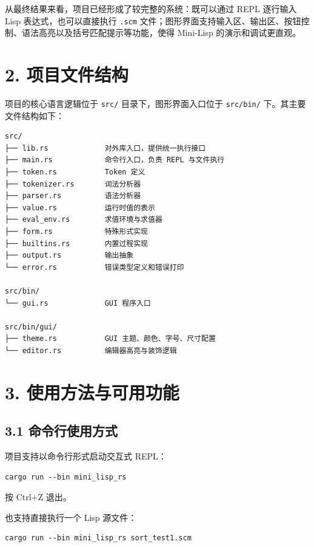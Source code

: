 \documentclass[12pt, a4paper]{ctexart}
\begin{document}
从最终结果来看，项目已经形成了较完整的系统：既可以通过 REPL 逐行输入 Lisp 表达式，也可以直接执行 \verb|.scm| 文件；图形界面支持输入区、输出区、按钮控制、语法高亮以及括号匹配提示等功能，使得 Mini-Lisp 的演示和调试更直观。

\section*{2. 项目文件结构}

项目的核心语言逻辑位于 \verb|src/| 目录下，图形界面入口位于 \verb|src/bin/| 下。其主要文件结构如下：

\begin{verbatim}
src/
├── lib.rs             对外库入口，提供统一执行接口
├── main.rs            命令行入口，负责 REPL 与文件执行
├── token.rs           Token 定义
├── tokenizer.rs       词法分析器
├── parser.rs          语法分析器
├── value.rs           运行时值的表示
├── eval_env.rs        求值环境与求值器
├── form.rs            特殊形式实现
├── builtins.rs        内置过程实现
├── output.rs          输出抽象
└── error.rs           错误类型定义和错误打印

src/bin/
└── gui.rs             GUI 程序入口

src/bin/gui/
├── theme.rs           GUI 主题、颜色、字号、尺寸配置
└── editor.rs          编辑器高亮与装饰逻辑
\end{verbatim}

\section*{3. 使用方法与可用功能}

\subsection*{3.1 命令行使用方式}

项目支持以命令行形式启动交互式 REPL：

\begin{verbatim}
cargo run --bin mini_lisp_rs
\end{verbatim}

按 Ctrl+Z 退出。

也支持直接执行一个 Lisp 源文件：

\begin{verbatim}
cargo run --bin mini_lisp_rs sort_test1.scm
\end{verbatim}
\end{document}
